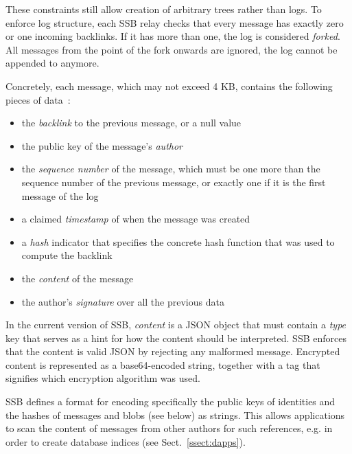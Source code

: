 \documentclass[9pt,sigconf]{acmart}
\begin{document}
These constraints still allow creation of arbitrary trees rather than
logs. To enforce log structure, each SSB relay checks that every
message has exactly zero or one incoming backlinks. If it has more
than one, the log is considered {\em forked}. All messages from the
point of the fork onwards are ignored, the log cannot be appended to
anymore.

Concretely, each message, which may not exceed 4 KB, contains the
following pieces of data~\cite{ssb-spec-messages}:

\begin{itemize}

\item the {\em backlink} to the previous message, or a null value

\item the public key of the message's {\em author}

\item the {\em sequence number} of the message, which must be one more
  than the sequence number of the previous message, or exactly one if
  it is the first message of the log

\item a claimed {\em timestamp} of when the message was created

\item a {\em hash} indicator that specifies the concrete hash function
  that was used to compute the backlink

\item the {\em content} of the message

\item the author's {\em signature} over all the previous data

\end{itemize}

In the current version of SSB, {\em content} is a JSON object that
must contain a {\em type} key that serves as a hint for how the
content should be interpreted. SSB enforces that the content is valid
JSON by rejecting any malformed message.  Encrypted content is
represented as a base64-encoded string, together with a tag that
signifies which encryption algorithm was used.

SSB defines a format for encoding specifically the public keys of
identities and the hashes of messages and blobs (see below) as
strings. This allows applications to scan the content of messages from
other authors for such references, e.g. in order to create database
indices (see Sect.~\ref{ssect:dapps}).
\end{document}

